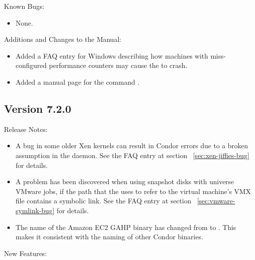 \noindent Known Bugs:

\begin{itemize}

\item None.

\end{itemize}

\noindent Additions and Changes to the Manual:

\begin{itemize}

\item Added a FAQ entry for Windows describing how machines
with miss-configured performance counters may cause the 
to crash.

\item Added a manual page for the command .

\end{itemize}



\subsection*{\label{sec:New-7-2-0}Version 7.2.0}

\noindent Release Notes:

\begin{itemize}

\item A bug in some older Xen kernels can result in Condor errors
due to a broken assumption in the  daemon.
See the FAQ entry at section~ \ref{sec:xen-jiffies-bug} for details.

\item A problem has been discovered when using snapshot disks with 
 universe VMware jobs,
if the path that the  uses to refer to the
virtual machine's VMX file contains a symbolic link.
See the FAQ entry at section~ \ref{sec:vmware-symlink-bug} for details.

\item The name of the Amazon EC2 GAHP binary has changed from
 to . This makes it consistent
with the naming of other Condor binaries.

\end{itemize}


\noindent New Features:

